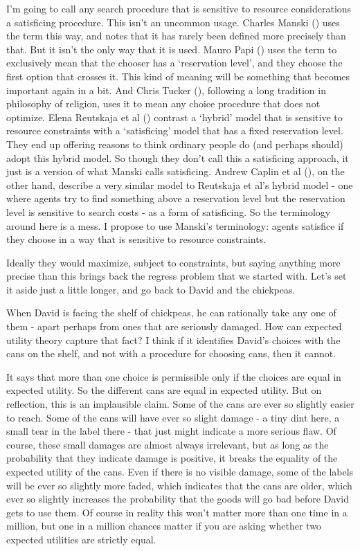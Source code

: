 \documentclass[
  11pt,
  letterpaper,
  DIV=11,
  numbers=noendperiod,
  twoside]{scrartcl}
\begin{document}
I'm going to call any search procedure that is sensitive to resource
considerations a satisficing procedure. This isn't an uncommon usage.
Charles Manski () uses the term this way,
and notes that it has rarely been defined more precisely than that. But
it isn't the only way that it is used. Mauro Papi
() uses the term to exclusively mean that
the chooser has a `reservation level', and they choose the first option
that crosses it. This kind of meaning will be something that becomes
important again in a bit. And Chris Tucker
(), following a long tradition in
philosophy of religion, uses it to mean any choice procedure that does
not optimize. Elena Reutskaja et al ()
contrast a `hybrid' model that is sensitive to resource constraints with
a `satisficing' model that has a fixed reservation level. They end up
offering reasons to think ordinary people do (and perhaps should) adopt
this hybrid model. So though they don't call this a satisficing
approach, it just is a version of what Manski calls satisficing. Andrew
Caplin et al (), on the other hand,
describe a very similar model to Reutskaja et al's hybrid model - one
where agents try to find something above a reservation level but the
reservation level is sensitive to search costs - as a form of
satisficing. So the terminology around here is a mess. I propose to use
Manski's terminology: agents satisfice if they choose in a way that is
sensitive to resource constraints.

Ideally they would maximize, subject to constraints, but saying anything
more precise than this brings back the regress problem that we started
with. Let's set it aside just a little longer, and go back to David and
the chickpeas.

When David is facing the shelf of chickpeas, he can rationally take any
one of them - apart perhaps from ones that are seriously damaged. How
can expected utility theory capture that fact? I think if it identifies
David's choices with the cans on the shelf, and not with a procedure for
choosing cans, then it cannot.

It says that more than one choice is permissible only if the choices are
equal in expected utility. So the different cans are equal in expected
utility. But on reflection, this is an implausible claim. Some of the
cans are ever so slightly easier to reach. Some of the cans will have
ever so slight damage - a tiny dint here, a small tear in the label
there - that just might indicate a more serious flaw. Of course, these
small damages are almost always irrelevant, but as long as the
probability that they indicate damage is positive, it breaks the
equality of the expected utility of the cans. Even if there is no
visible damage, some of the labels will be ever so slightly more faded,
which indicates that the cans are older, which ever so slightly
increases the probability that the goods will go bad before David gets
to use them. Of course in reality this won't matter more than one time
in a million, but one in a million chances matter if you are asking
whether two expected utilities are strictly equal.
\end{document}
